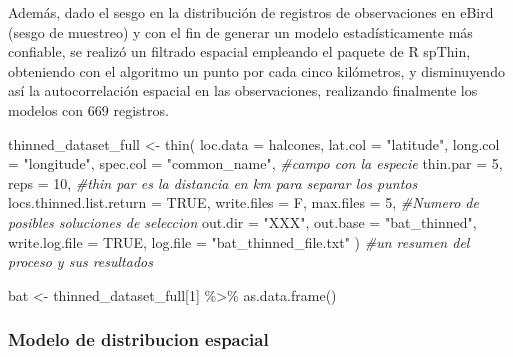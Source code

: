 \documentclass[
]{article}
\newenvironment{Shaded}{\begin{snugshade}}{\end{snugshade}}
\newcommand{\AttributeTok}[1]{\textcolor[rgb]{0.77,0.63,0.00}{#1}}
\newcommand{\CommentTok}[1]{\textcolor[rgb]{0.56,0.35,0.01}{\textit{#1}}}
\newcommand{\ConstantTok}[1]{\textcolor[rgb]{0.00,0.00,0.00}{#1}}
\newcommand{\DecValTok}[1]{\textcolor[rgb]{0.00,0.00,0.81}{#1}}
\newcommand{\FunctionTok}[1]{\textcolor[rgb]{0.00,0.00,0.00}{#1}}
\newcommand{\NormalTok}[1]{#1}
\newcommand{\OtherTok}[1]{\textcolor[rgb]{0.56,0.35,0.01}{#1}}
\newcommand{\SpecialCharTok}[1]{\textcolor[rgb]{0.00,0.00,0.00}{#1}}
\newcommand{\StringTok}[1]{\textcolor[rgb]{0.31,0.60,0.02}{#1}}
\begin{document}
Además, dado el sesgo en la distribución de registros de observaciones
en eBird (sesgo de muestreo) y con el fin de generar un modelo
estadísticamente más confiable, se realizó un filtrado espacial
empleando el paquete de R spThin, obteniendo con el algoritmo un punto
por cada cinco kilómetros, y disminuyendo así la autocorrelación
espacial en las observaciones, realizando finalmente los modelos con 669
registros.

\begin{Shaded}
\begin{Highlighting}[]
\NormalTok{thinned\_dataset\_full }\OtherTok{\textless{}{-}} \FunctionTok{thin}\NormalTok{( }\AttributeTok{loc.data =}\NormalTok{ halcones, }
        \AttributeTok{lat.col =} \StringTok{"latitude"}\NormalTok{, }\AttributeTok{long.col =} \StringTok{"longitude"}\NormalTok{, }
        \AttributeTok{spec.col =} \StringTok{"common\_name"}\NormalTok{, }\CommentTok{\#campo con la especie}
        \AttributeTok{thin.par =} \DecValTok{5}\NormalTok{, }\AttributeTok{reps =} \DecValTok{10}\NormalTok{, }\CommentTok{\#thin par es la distancia en km para separar los puntos}
        \AttributeTok{locs.thinned.list.return =} \ConstantTok{TRUE}\NormalTok{, }
        \AttributeTok{write.files =}\NormalTok{ F, }
        \AttributeTok{max.files =} \DecValTok{5}\NormalTok{, }\CommentTok{\#Numero de posibles soluciones de seleccion}
        \AttributeTok{out.dir =} \StringTok{"XXX"}\NormalTok{, }
        \AttributeTok{out.base =} \StringTok{"bat\_thinned"}\NormalTok{, }
        \AttributeTok{write.log.file =} \ConstantTok{TRUE}\NormalTok{,}
        \AttributeTok{log.file =} \StringTok{"bat\_thinned\_file.txt"}\NormalTok{ ) }\CommentTok{\#un resumen del proceso y sus resultados}


\NormalTok{ bat }\OtherTok{\textless{}{-}}\NormalTok{ thinned\_dataset\_full[}\DecValTok{1}\NormalTok{] }\SpecialCharTok{\%\textgreater{}\%} 
        \FunctionTok{as.data.frame}\NormalTok{()}
\end{Highlighting}
\end{Shaded}

\hypertarget{modelo-de-distribucion-espacial}{%
\subsubsection{Modelo de distribucion
espacial}\label{modelo-de-distribucion-espacial}}
\end{document}
